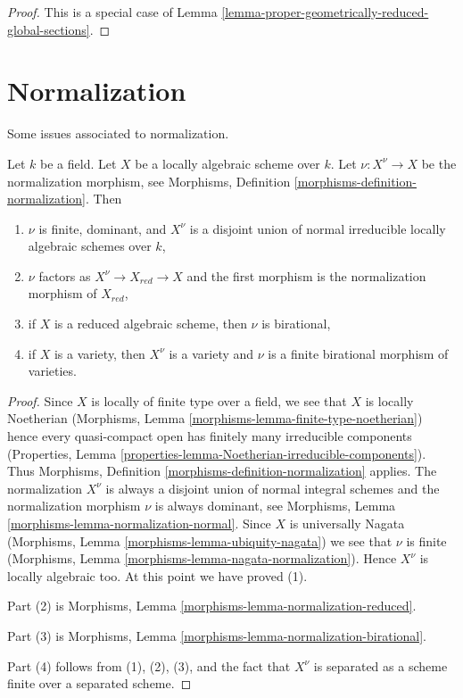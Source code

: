 \begin{proof}
This is a special case of
Lemma \ref{lemma-proper-geometrically-reduced-global-sections}.
\end{proof}




\section{Normalization}
\label{section-normalization}

\noindent
Some issues associated to normalization.

\begin{lemma}
\label{lemma-normalization-locally-algebraic}
Let $k$ be a field. Let $X$ be a locally algebraic scheme over $k$.
Let $\nu : X^\nu \to X$ be the normalization morphism, see
Morphisms, Definition \ref{morphisms-definition-normalization}.
Then
\begin{enumerate}
\item $\nu$ is finite, dominant, and $X^\nu$ is a disjoint
union of normal irreducible locally algebraic schemes over $k$,
\item $\nu$ factors as $X^\nu \to X_{red} \to X$ and the first
morphism is the normalization morphism of $X_{red}$,
\item if $X$ is a reduced algebraic scheme, then $\nu$ is
birational,
\item if $X$ is a variety, then $X^\nu$ is a variety and
$\nu$ is a finite birational morphism of varieties.
\end{enumerate}
\end{lemma}

\begin{proof}
Since $X$ is locally of finite type over a field, we see that
$X$ is locally Noetherian
(Morphisms, Lemma \ref{morphisms-lemma-finite-type-noetherian})
hence every quasi-compact open has finitely many irreducible
components (Properties, Lemma
\ref{properties-lemma-Noetherian-irreducible-components}).
Thus Morphisms, Definition \ref{morphisms-definition-normalization} applies.
The normalization $X^\nu$ is always a disjoint union of normal integral
schemes and the normalization morphism $\nu$ is always dominant, see
Morphisms, Lemma \ref{morphisms-lemma-normalization-normal}.
Since $X$ is universally Nagata
(Morphisms, Lemma \ref{morphisms-lemma-ubiquity-nagata})
we see that $\nu$ is finite
(Morphisms, Lemma \ref{morphisms-lemma-nagata-normalization}).
Hence $X^\nu$ is locally algebraic too.
At this point we have proved (1).

\medskip\noindent
Part (2) is Morphisms, Lemma \ref{morphisms-lemma-normalization-reduced}.

\medskip\noindent
Part (3) is Morphisms, Lemma \ref{morphisms-lemma-normalization-birational}.

\medskip\noindent
Part (4) follows from (1), (2), (3), and the fact that $X^\nu$ is
separated as a scheme finite over a separated scheme.
\end{proof}

